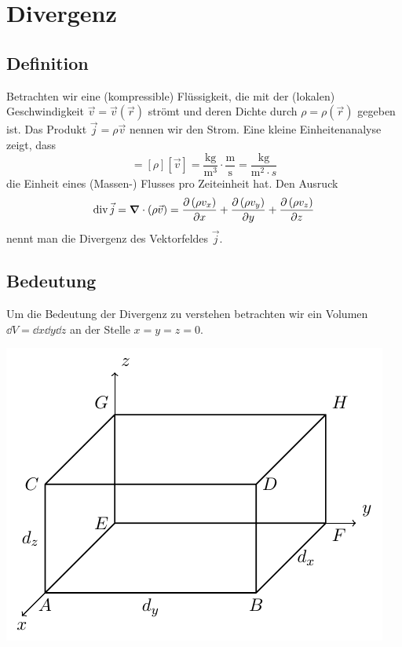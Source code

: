 \documentclass[paper=a4, fontsize=11.0pt, abstractoff, DIV12]{scrartcl}
\begin{document}
\section{Divergenz}

\subsection{Definition}

Betrachten wir eine (kompressible) Flüssigkeit, die mit der (lokalen)
Geschwindigkeit $\vec v= \vec v(\vec r)$ strömt und deren Dichte durch $\rho
= \rho(\vec r)$ gegeben ist. Das Produkt $\vec j = \rho \vec v$ nennen wir den Strom. Eine kleine Einheitenanalyse zeigt, dass
\begin{equation*}
[\vec j] = [\rho][\vec v] = \frac{\mathrm{kg}}{\mathrm{m^3}}\cdot\frac{\mathrm{m}}{\mathrm{s}} = \frac{\mathrm{kg}}{\mathrm{m^2}\cdot{s}}
\end{equation*}
die Einheit eines (Massen-) Flusses pro Zeiteinheit hat. Den Ausruck
\begin{equation}
\div \vec j = \nabla\cdot(\rho \vec v) = \firstpderiv{\left(\rho v_x\right)}{x} + \firstpderiv{\left(\rho v_y\right)}{y} + \firstpderiv{\left(\rho v_z\right)}{z}
\end{equation}
nennt man die Divergenz des Vektorfeldes $\vec j$.

\subsection{Bedeutung}

Um die Bedeutung der Divergenz zu verstehen betrachten wir ein Volumen $\dd V = \dd x \dd y \dd z$ an der Stelle $x=y=z=0$.

\begin{center}
    \includegraphics{Figures/div}
\end{center}
\end{document}
